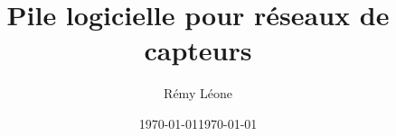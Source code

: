 \documentclass[twocolumns]{article}
\date{\today}
\title{Pile logicielle pour réseaux de capteurs}
\author{Rémy Léone}
\date{\today}
\begin{document}
\maketitle



\begin{multicols}{2}










\nocite{*}



\end{multicols}
\end{document}

